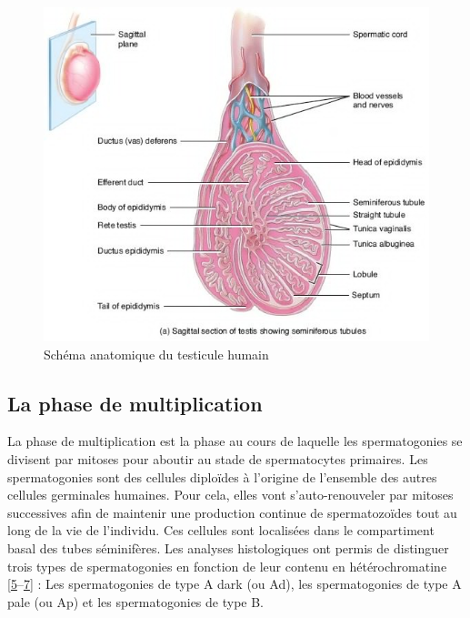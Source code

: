 \documentclass[12pt,twoside]{ugathesis}
\theoremstyle{definition}
\theoremstyle{definition}
\theoremstyle{remark}
\begin{document}
\begin{figure}

{\centering \includegraphics[scale=0.65]{figure/coupe_testicule2} 

}

\caption{Schéma anatomique du testicule humain}\label{fig:testicule}
\end{figure}

\newpage

\subsection{La phase de
multiplication}\label{la-phase-de-multiplication}

La phase de multiplication est la phase au cours de laquelle les
spermatogonies se divisent par mitoses pour aboutir au stade de
spermatocytes primaires. Les spermatogonies sont des cellules diploïdes
à l'origine de l'ensemble des autres cellules germinales humaines. Pour
cela, elles vont s'auto-renouveler par mitoses successives afin de
maintenir une production continue de spermatozoïdes tout au long de la
vie de l'individu. Ces cellules sont localisées dans le compartiment
basal des tubes séminifères. Les analyses histologiques ont permis de
distinguer trois types de spermatogonies en fonction de leur contenu en
hétérochromatine
{[}\protect\hyperlink{ref-Clermont1963}{5}--\protect\hyperlink{ref-Goossens2013}{7}{]}
: Les spermatogonies de type A dark (ou Ad), les spermatogonies de type
A pale (ou Ap) et les spermatogonies de type B.
\end{document}
